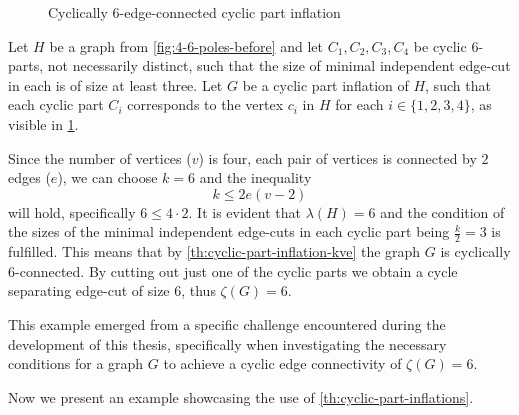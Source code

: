 \documentclass[12pt, twoside]{book}
\begin{document}
\begin{example}
\begin{figure}
		\caption{Cyclically 6-edge-connected cyclic part inflation}
		\label{fig:4-6-poles-inflation}
	\end{figure}

	Let $H$ be a graph from \cref{fig:4-6-poles-before} and let $C_1,C_2,C_3,C_4$ be cyclic 6-parts, not necessarily distinct, such that the size of minimal independent edge-cut in each is of size at least three. Let $G$ be a cyclic part inflation of $H$, such that each cyclic part $C_i$ corresponds to the vertex $c_i$ in $H$ for each $i\in\{1,2,3,4\}$, as visible in \cref{fig:4-6-poles-inflation}.
	
	Since the number of vertices ($v$) is four, each pair of vertices is connected by $2$ edges ($e$), we can choose $k=6$ and the inequality 
	$$k\leq 2e(v-2)$$
	will hold, specifically $6\leq 4\cdot 2$. It is evident that $\lambda(H)=6$ and the condition of the sizes of the minimal independent edge-cuts in each cyclic part being $\frac{k}{2}=3$ is fulfilled. This means that by \cref{th:cyclic-part-inflation-kve} the graph $G$ is cyclically 6-connected. By cutting out just one of the cyclic parts we obtain a cycle separating edge-cut of size 6, thus $\zeta(G)=6$.
	
	This example emerged from a specific challenge encountered during the development of this thesis, specifically when investigating the necessary conditions for a graph $G$ to achieve a cyclic edge connectivity of $\zeta(G)=6$.
\end{example}

Now we present an example showcasing the use of \cref{th:cyclic-part-inflations}.
\end{document}
